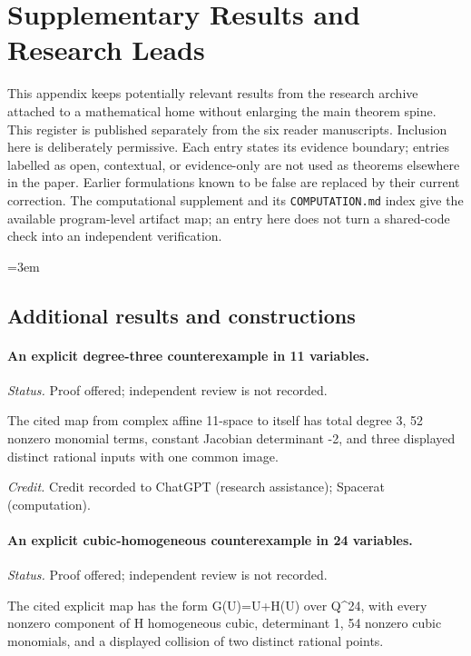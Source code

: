\section{Supplementary Results and Research Leads}
\label{app:supplementary-register-05}

This appendix keeps potentially relevant results from the research
archive attached to a mathematical home without enlarging the main
theorem spine.  This register is published separately from the six reader manuscripts.  Inclusion here is deliberately permissive.  Each entry
states its evidence boundary; entries labelled as open, contextual, or
evidence-only are not used as theorems elsewhere in the paper.  Earlier
formulations known to be false are replaced by their current correction.
The computational supplement and its \texttt{COMPUTATION.md} index give
the available program-level artifact map; an entry here does not turn a
shared-code check into an independent verification.
\begingroup\raggedright\emergencystretch=3em

\subsection{Additional results and constructions}

\label{supp-note-05-001}
\paragraph{An explicit degree-three counterexample in 11 variables.}
\emph{Status.} Proof offered; independent review is not recorded.

The cited map from complex affine 11-space to itself has total degree 3, 52 nonzero monomial terms, constant Jacobian determinant -2, and three displayed distinct rational inputs with one common image.

\emph{Credit.} Credit recorded to ChatGPT (research assistance); Spacerat (computation).

\label{supp-note-05-002}
\paragraph{An explicit cubic-homogeneous counterexample in 24 variables.}
\emph{Status.} Proof offered; independent review is not recorded.

The cited explicit map has the form G(U)=U+H(U) over Q\textasciicircum{}24, with every nonzero component of H homogeneous cubic, determinant 1, 54 nonzero cubic monomials, and a displayed collision of two distinct rational points.

